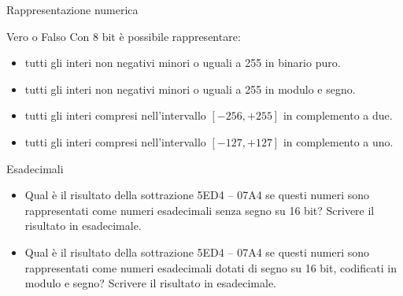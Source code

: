 \documentclass[11pt]{article}
\begin{document}
\begin{quiz}{Rappresentazione numerica}
\begin{cloze}[points=1,shuffle=false]{Vero o Falso}
Con 8 bit è possibile rappresentare:
\begin{itemize}
\item tutti gli interi non negativi minori o uguali a 255 in binario puro.
\item tutti gli interi non negativi minori o uguali a 255 in modulo e segno.
\item tutti gli interi compresi nell'intervallo $[-256,+255]$ in complemento a due.
\item tutti gli interi compresi nell'intervallo $[-127,+127]$ in complemento a uno.
\end{itemize}
\end{cloze}

\begin{cloze}[points=1,shuffle=false]{Esadecimali}
\begin{itemize}
\item Qual è il risultato della sottrazione 5ED4 – 07A4 se questi numeri sono rappresentati come numeri esadecimali senza segno su 16 bit? Scrivere il risultato in esadecimale.
\item Qual è il risultato della sottrazione 5ED4 – 07A4 se questi numeri sono rappresentati come numeri esadecimali dotati di segno su 16 bit, codificati in modulo e segno? Scrivere il risultato in esadecimale.
\end{itemize}
\end{cloze}


\end{quiz}
\end{document}
